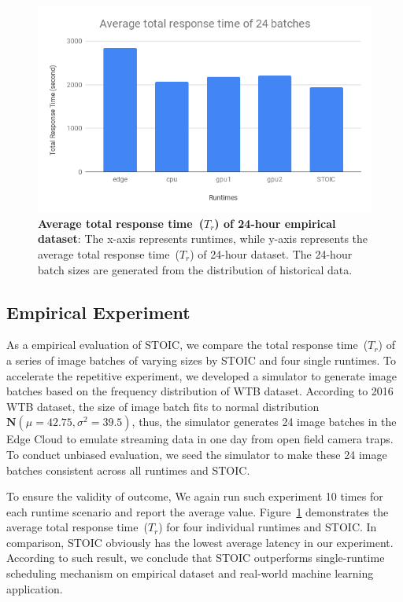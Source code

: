 \begin{figure}[t] \centering 
\includegraphics[scale=0.42]{figures/24-batches}
\caption{\textbf{Average total response time~($T_r$) of 24-hour empirical dataset}: The x-axis represents runtimes, while y-axis represents the average total response time~($T_r$) of 24-hour dataset. The 24-hour batch sizes are generated from the distribution of historical data. 
\label{fig:24-batch}}
\end{figure}


\subsection{Empirical Experiment}

As a empirical evaluation of STOIC, we compare the total response time~($T_r$) of a series of image batches of varying sizes by STOIC and four single runtimes. To accelerate the repetitive experiment, we developed a simulator to generate image batches based on the frequency distribution of WTB dataset. According to 2016 WTB dataset, the size of image batch fits to normal distribution $\mathbf{N}(\mu = 42.75, \sigma^2 = 39.5)$, thus, the simulator generates 24 image batches in the Edge Cloud to emulate streaming data in one day from open field camera traps. To conduct unbiased evaluation, we seed the simulator to make these 24 image batches consistent across all runtimes and STOIC. 

To ensure the validity of outcome, We again run such experiment 10 times for each runtime scenario and report the average value. Figure~\ref{fig:24-batch} demonstrates the average total response time~($T_r$) for four individual runtimes and STOIC. In comparison, STOIC obviously has the lowest average latency in our experiment. According to such result, we conclude that STOIC outperforms single-runtime scheduling mechanism on empirical dataset and real-world machine learning application.



